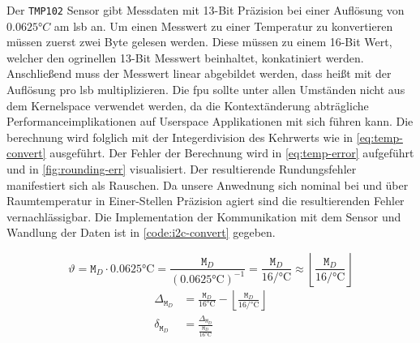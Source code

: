 Der \texttt{TMP102} Sensor gibt Messdaten mit 13-Bit Präzision bei einer Auflösung von $0.0625\si{\degree C}$ am \gls{lsb} an.
Um einen Messwert zu einer Temperatur zu konvertieren müssen zuerst zwei Byte gelesen werden.
Diese müssen zu einem 16-Bit Wert, welcher den ogrinellen 13-Bit Messwert beinhaltet, konkatiniert werden.
Anschlie{\ss}end muss der Messwert linear abgebildet werden, dass hei{\ss}t mit der Auflösung pro \gls{lsb} multiplizieren.
Die \gls{fpu} sollte unter allen Umständen nicht aus dem Kernelspace verwendet werden,
da die Kontextänderung abträgliche Performanceimplikationen auf Userspace Applikationen mit sich führen kann.
Die berechnung wird folglich mit der Integerdivision des Kehrwerts wie in \autoref{eq:temp-convert} ausgeführt.
Der Fehler der Berechnung wird in \autoref{eq:temp-error} aufgeführt und in \autoref{fig:rounding-err} visualisiert.
Der resultierende Rundungsfehler manifestiert sich als Rauschen.
Da unsere Anwednung sich nominal bei und über Raumtemperatur in Einer-Stellen Präzision agiert sind die resultierenden Fehler vernachlässigbar.
Die Implementation der Kommunikation mit dem Sensor und Wandlung der Daten ist in \autoref{code:i2c-convert} gegeben.

\begin{equation}
    \vartheta = \texttt{M}_D \cdot 0.0625\si{\celsius} = \frac{\texttt{M}_D}{\left(0.0625\si{\celsius}\right)^{-1}} = \frac{\texttt{M}_D}{16\si{\per\celsius}} \approx \left\lfloor\frac{\texttt{M}_D}{16\si{\per\celsius}}\right\rfloor
    \label{eq:temp-convert}
\end{equation}
\begin{equation}
    \begin{aligned}
        \Delta_{\texttt{M}_D} &= \frac{\texttt{M}_D}{16\si{\celsius}} - \left\lfloor\frac{\texttt{M}_D}{16\si{\per\celsius}}\right\rfloor \\[2ex]
        \delta_{\texttt{M}_D} &= \frac{\Delta_{\texttt{M}_D}}{\frac{\texttt{M}_D}{16\si{\celsius}} }\\[2ex]
    \end{aligned}
    \label{eq:temp-error}
\end{equation}



